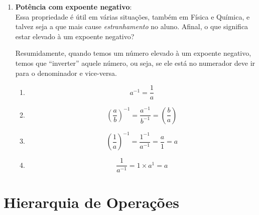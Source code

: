 \begin{enumerate}
    Mesmo caso da potência de uma multiplicação, fazemos a potência de cada um e depois dividimos:

    \begin{equation}
        \left( \frac{a}{b} \right)^n = \frac{a^n}{b^n} 
    \end{equation}
    
    \item \textbf{Potência com expoente negativo}:\\

    Essa propriedade é útil em várias situações, também em Física e Química, e talvez seja a que mais cause \textit{estranhamento} no aluno. Afinal, o que significa estar elevado à um expoente negativo?

    Resumidamente, quando temos um número elevado à um expoente negativo, temos que ``inverter'' aquele número, ou seja, se ele está no numerador deve ir para o denominador e vice-versa. 

    \begin{tcolorbox}[title= Expoente (-1)]
        \begin{enumerate}
        
            \item \begin{equation}
                a^{-1}=\frac{1}{a}
            \end{equation}
            
            \item \begin{equation}
                \left( \frac{a}{b}\right)^{-1}=\frac{a^{-1}}{b^{-1}}=\left( \frac{b}{a}\right)
            \end{equation}

            \item \begin{equation}
                \left( \frac{1}{a} \right)^{-1}=\frac{1^{-1}}{a^{-1}}=\frac{a}{1}=a
            \end{equation}

            \item \begin{equation}
                \frac{1}{a^{-1}}=1\times a^{1}=a
            \end{equation}
        \end{enumerate}
    \end{tcolorbox}
\end{enumerate}

\newpage
\section{Hierarquia de Operações}

